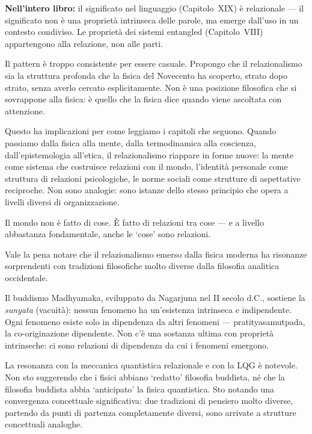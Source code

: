 \documentclass[12pt,a4paper,openany]{book}
\newcommand{\sezione}[1]{\vspace{1.2em}{\large\bfseries #1}\vspace{0.5em}\par}
\begin{document}
\textbf{Nell'intero libro:} il significato nel linguaggio (Capitolo~XIX) è relazionale — il significato non è una proprietà intrinseca delle parole, ma emerge dall'uso in un contesto condiviso. Le proprietà dei sistemi entangled (Capitolo~VIII) appartengono alla relazione, non alle parti.

Il pattern è troppo consistente per essere casuale. Propongo che il relazionalismo sia la struttura profonda che la fisica del Novecento ha scoperto, strato dopo strato, senza averlo cercato esplicitamente. Non è una posizione filosofica che si sovrappone alla fisica: è quello che la fisica dice quando viene ascoltata con attenzione.

Questo ha implicazioni per come leggiamo i capitoli che seguono. Quando passiamo dalla fisica alla mente, dalla termodinamica alla coscienza, dall'epistemologia all'etica, il relazionalismo riappare in forme nuove: la mente come sistema che costruisce relazioni con il mondo, l'identità personale come struttura di relazioni psicologiche, le norme sociali come strutture di aspettative reciproche. Non sono analogie: sono istanze dello stesso principio che opera a livelli diversi di organizzazione.

Il mondo non è fatto di cose. È fatto di relazioni tra cose — e a livello abbastanza fondamentale, anche le `cose' sono relazioni.

\sezione{Il relazionalismo e la filosofia orientale: convergenze inaspettate}

Vale la pena notare che il relazionalismo emerso dalla fisica moderna ha risonanze sorprendenti con tradizioni filosofiche molto diverse dalla filosofia analitica occidentale.

Il buddismo Madhyamaka, sviluppato da Nagarjuna nel II secolo d.C., sostiene la \textit{sunyata} (vacuità): nessun fenomeno ha un'esistenza intrinseca e indipendente. Ogni fenomeno esiste solo in dipendenza da altri fenomeni --- pratityasamutpada, la co-originazione dipendente. Non c'è una sostanza ultima con proprietà intrinseche: ci sono relazioni di dipendenza da cui i fenomeni emergono.

La resonanza con la meccanica quantistica relazionale e con la LQG è notevole. Non sto suggerendo che i fisici abbiano `redatto' filosofia buddista, né che la filosofia buddista abbia `anticipato' la fisica quantistica. Sto notando una convergenza concettuale significativa: due tradizioni di pensiero molto diverse, partendo da punti di partenza completamente diversi, sono arrivate a strutture concettuali analoghe.
\end{document}
